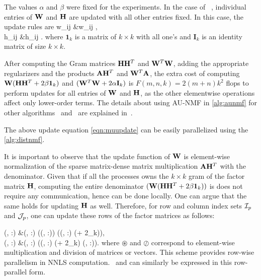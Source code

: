 The values $\alpha$ and $\beta$ were fixed for the experiments. 
In the case of \MU\ \cite{seung2001algorithms}, individual entries of $\mathbf{W}$ and $\mathbf{H}$ are updated with all other entries fixed.
In this case, the update rules are 
\SplitN{\label{eqn:muupdate}} {
w_{ij} &\leftarrow w_{ij} , \\
h_{ij} &\leftarrow  h_{ij} .
} 
where $\mathbf{1}_k$ is a matrix of $k \times k$ with all one's and $\mathbf{I}_k$ is an identity matrix of size $k \times k$. 

After computing the Gram matrices $\mathbf{H}\mathbf{H}^T$ and $\mathbf{W}^T \mathbf{W}$, adding the appropriate regularizers and the products $\mathbf{A}\mathbf{H}^T$ and $\mathbf{W}^T\mathbf{A}$, the extra cost of computing $\mathbf{W} (\mathbf{H} \mathbf{H}^T+ 2\beta \mathbf{1}_k)$ and $(\mathbf{W}^T \mathbf{W}+ 2\alpha\mathbf{I}_k)$ is $F(m,n,k)=2(m+n)k^2$ flops to perform updates for all entries of $\mathbf{W}$ and $\mathbf{H}$, as the other elementwise operations affect only lower-order terms.
The details about using AU-NMF in \cref{alg:aunmf} for other algorithms \HALS\ and \BPP\ are explained in~\cite{KBP16,KBP16MPIFAUN}. 

The above update equation \cref{eqn:muupdate} can be easily parallelized using the \cref{alg:distnmf}. 


It is important to observe that the update function of $\mathbf{W}$ is element-wise normalization of the sparse matrix-dense matrix multiplication $\mathbf{A} \mathbf{H}^T$ with the denominator. Given that if all the processes owns the $k \times k$ gram of the factor matrix $\mathbf{H}$, computing the entire denominator $(\mathbf{W} (\mathbf{H} \mathbf{H}^T+ 2\beta \mathbf{1}_k))$ is does not require any communication, hence can be done locally.
One can argue that the same holds for updating $\mathbf{H}$ as well.
Therefore, for row and column index sets $\mathcal{I}_p$ and $\mathcal{J}_p$, one can update these rows of the factor matrices as follows:

\SplitN{\label{eqn:muupdate}} {
\Wm(\Ip, :) &\leftarrow \Wm(\Ip, :) \circledast (\Wmt(\Ip, :)) \oslash (\Wm(\Ip, :) (\Hmgr+ 2\beta {}_k)), \\
\Hm(\Jp, :) &\leftarrow  \Hm(\Jp, :) \circledast (\Hmt(\Jp, :) \oslash (\Wmgr+ 2\alpha{}_k) \Hm(\Jp, :)).
}
where $\circledast$ and $\oslash$ correspond to element-wise multiplication and division of matrices or vectors.
This scheme provides row-wise parallelism in NNLS computation.
\HALS\ and \BPP can similarly be expressed in this row-parallel form.

